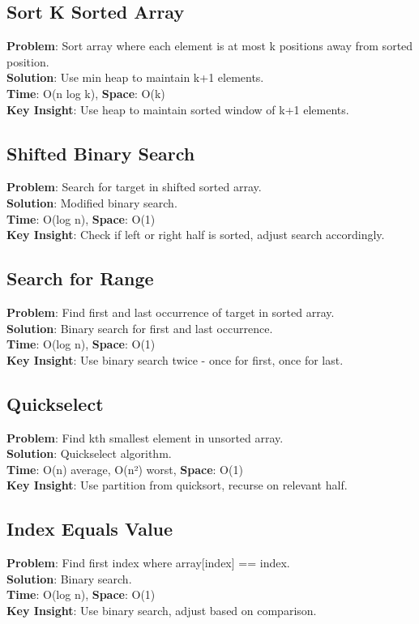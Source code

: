 \documentclass{report}
\begin{document}
\subsection{Sort K Sorted Array}
\textbf{Problem}: Sort array where each element is at most k positions away from sorted position.\\
\textbf{Solution}: Use min heap to maintain k+1 elements.\\
\textbf{Time}: O(n log k), \textbf{Space}: O(k)\\
\textbf{Key Insight}: Use heap to maintain sorted window of k+1 elements.

\subsection{Shifted Binary Search}
\textbf{Problem}: Search for target in shifted sorted array.\\
\textbf{Solution}: Modified binary search.\\
\textbf{Time}: O(log n), \textbf{Space}: O(1)\\
\textbf{Key Insight}: Check if left or right half is sorted, adjust search accordingly.

\subsection{Search for Range}
\textbf{Problem}: Find first and last occurrence of target in sorted array.\\
\textbf{Solution}: Binary search for first and last occurrence.\\
\textbf{Time}: O(log n), \textbf{Space}: O(1)\\
\textbf{Key Insight}: Use binary search twice - once for first, once for last.

\subsection{Quickselect}
\textbf{Problem}: Find kth smallest element in unsorted array.\\
\textbf{Solution}: Quickselect algorithm.\\
\textbf{Time}: O(n) average, O(n²) worst, \textbf{Space}: O(1)\\
\textbf{Key Insight}: Use partition from quicksort, recurse on relevant half.

\subsection{Index Equals Value}
\textbf{Problem}: Find first index where array[index] == index.\\
\textbf{Solution}: Binary search.\\
\textbf{Time}: O(log n), \textbf{Space}: O(1)\\
\textbf{Key Insight}: Use binary search, adjust based on comparison.
\end{document}
